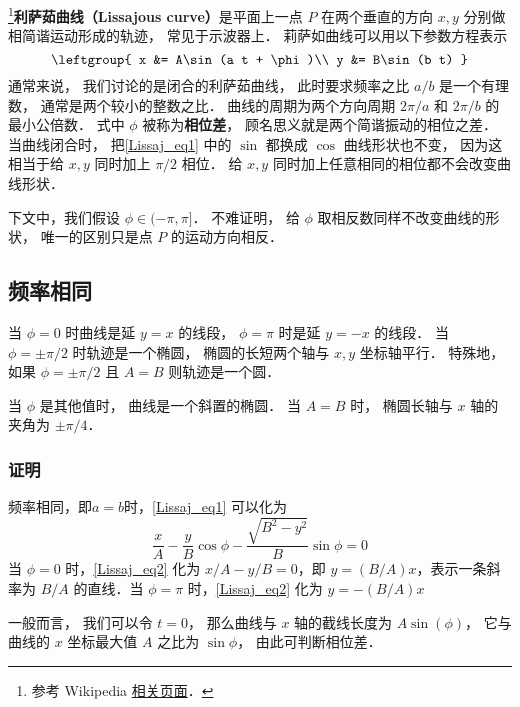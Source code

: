 
\begin{issues}
\issueDraft
\end{issues}


\footnote{参考 Wikipedia \href{https://en.wikipedia.org/wiki/Lissajous_curve}{相关页面}．}\textbf{利萨茹曲线（Lissajous curve）}是平面上一点 $P$ 在两个垂直的方向 $x, y$ 分别做相简谐运动形成的轨迹， 常见于示波器上． 莉萨如曲线可以用以下参数方程表示
\begin{equation}\label{Lissaj_eq1}
\leftgroup{
x &= A\sin(a t + \phi)\\
y &= B\sin(b t)
}\end{equation}
通常来说， 我们讨论的是闭合的利萨茹曲线， 此时要求频率之比 $a/b$ 是一个有理数， 通常是两个较小的整数之比． 曲线的周期为两个方向周期 $2\pi/a$ 和 $2\pi/b$ 的最小公倍数． 式中 $\phi$ 被称为\textbf{相位差}， 顾名思义就是两个简谐振动的相位之差． 当曲线闭合时， 把\autoref{Lissaj_eq1} 中的 $\sin$ 都换成 $\cos$ 曲线形状也不变， 因为这相当于给 $x, y$ 同时加上 $\pi/2$ 相位． 给 $x, y$ 同时加上任意相同的相位都不会改变曲线形状．

下文中，我们假设 $\phi \in (-\pi, \pi]$． 不难证明， 给 $\phi$ 取相反数同样不改变曲线的形状， 唯一的区别只是点 $P$ 的运动方向相反．

\subsection{频率相同}
当 $\phi = 0$ 时曲线是延 $y=x$ 的线段， $\phi = \pi$ 时是延 $y=-x$ 的线段． 当 $\phi = \pm\pi/2$ 时轨迹是一个椭圆， 椭圆的长短两个轴与 $x,y$ 坐标轴平行． 特殊地， 如果 $\phi = \pm\pi/2$ 且 $A = B$ 则轨迹是一个圆．

当 $\phi$ 是其他值时， 曲线是一个斜置的椭圆． 当 $A = B$ 时， 椭圆长轴与 $x$ 轴的夹角为 $\pm\pi/4$．
\subsubsection{证明}
频率相同，即$a=b$时，\autoref{Lissaj_eq1} 可以化为
\begin{equation}\label{Lissaj_eq2}
\frac xA-\frac yB\cos\phi-\frac{\sqrt{B^2-y^2}}{B}\sin\phi=0
\end{equation}
当 $\phi=0$ 时，\autoref{Lissaj_eq2} 化为 $x/A-y/B=0$，即 $y=(B/A)x$，表示一条斜率为 $B/A$ 的直线．当 $\phi=\pi$ 时，\autoref{Lissaj_eq2} 化为 $y=-(B/A)x$

一般而言， 我们可以令 $t = 0$， 那么曲线与 $x$ 轴的截线长度为 $A\sin(\phi)$， 它与曲线的 $x$ 坐标最大值 $A$ 之比为 $\sin\phi$， 由此可判断相位差．

